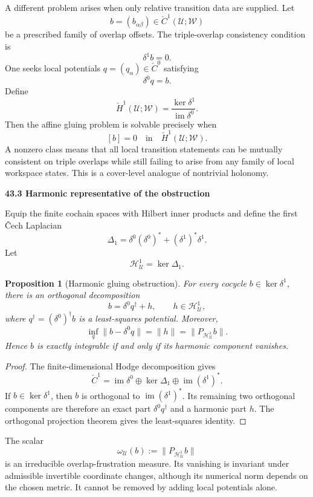 \documentclass[11pt,letterpaper]{article}
\newcommand{\subtopic}[1]{%
 \vspace{0.45em}
 {\bfseries\color{AccentColor} #1\par}
}
\theoremstyle{plain}
\newtheorem{proposition}[theorem]{Proposition}
\theoremstyle{definition}
\begin{document}
A different problem arises when only relative transition data are supplied.
Let
\[
b=(b_{\alpha\beta})\in\check C^1(\mathcal U;\mathscr W)
\]
be a prescribed family of overlap offsets. The triple-overlap consistency
condition is
\[
\delta^1b=0.
\]
One seeks local potentials \(q=(q_\alpha)\in\check C^0\) satisfying
\[
\delta^0q=b.
\]
Define
\[
\boxed{
\check H^1(\mathcal U;\mathscr W)
=
\frac{\ker\delta^1}{\operatorname{im}\delta^0}.
}
\]
Then the affine gluing problem is solvable precisely when
\[
\boxed{[b]=0\quad\text{in}\quad\check H^1(\mathcal U;\mathscr W).}
\]
A nonzero class means that all local transition statements can be mutually
consistent on triple overlaps while still failing to arise from any family of
local workspace states. This is a cover-level analogue of nontrivial holonomy.

\subtopic{43.3 Harmonic representative of the obstruction}

Equip the finite cochain spaces with Hilbert inner products and define the
first \v{C}ech Laplacian
\[
\boxed{
\Delta_1
=
\delta^0(\delta^0)^*
+
(\delta^1)^*\delta^1.
}
\]
Let
\[
\mathcal H^1_{\mathcal U}=\ker\Delta_1.
\]

\begin{proposition}[Harmonic gluing obstruction]\label{prop:harmonic-gluing-obstruction}
For every cocycle \(b\in\ker\delta^1\), there is an orthogonal decomposition
\[
\boxed{
b=\delta^0q^\dagger+h,
\qquad
h\in\mathcal H^1_{\mathcal U},
}
\]
where \(q^\dagger=(\delta^0)^\dagger b\) is a least-squares potential. Moreover,
\[
\boxed{
\inf_q\|b-\delta^0q\|
=
\|h\|
=
\|P_{\mathcal H^1_{\mathcal U}}b\|.
}
\]
Hence \(b\) is exactly integrable if and only if its harmonic component
vanishes.
\end{proposition}

\begin{proof}
The finite-dimensional Hodge decomposition gives
\[
\check C^1
=
\operatorname{im}\delta^0
\oplus
\ker\Delta_1
\oplus
\operatorname{im}(\delta^1)^*.
\]
If \(b\in\ker\delta^1\), then \(b\) is orthogonal to
\(\operatorname{im}(\delta^1)^*\). Its remaining two orthogonal components are
therefore an exact part \(\delta^0q^\dagger\) and a harmonic part \(h\). The
orthogonal projection theorem gives the least-squares identity.
\end{proof}

The scalar
\[
\omega_{\mathcal U}(b)
:=
\|P_{\mathcal H^1_{\mathcal U}}b\|
\]
is an irreducible overlap-frustration measure. Its vanishing is
invariant under admissible invertible coordinate changes, although its numerical
norm depends on the chosen metric. It cannot be removed by adding local
potentials alone.
\end{document}
